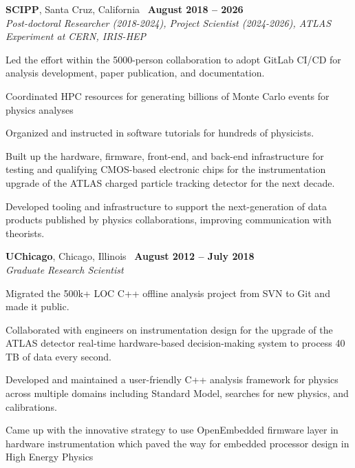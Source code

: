 \documentclass[margin,line]{resume}
\begin{document}
\begin{resume}
\textbf{SCIPP}, Santa Cruz, California \hfill \faCalendar\ \textbf{August 2018 -- 2026}\\
\textsl{Post-doctoral Researcher (2018-2024), Project Scientist (2024-2026), ATLAS Experiment at CERN, IRIS-HEP}
\begin{list2}
  \small
  \item Led the effort within the 5000-person collaboration to adopt GitLab CI/CD for analysis development, paper publication, and documentation.
  \item Coordinated HPC resources for generating billions of Monte Carlo events for physics analyses
  \item Organized and instructed in software tutorials for hundreds of physicists.
  \item Built up the hardware, firmware, front-end, and back-end infrastructure for testing and qualifying CMOS-based electronic chips for the instrumentation upgrade of the ATLAS charged particle tracking detector for the next decade.
  \item Developed tooling and infrastructure to support the next-generation of data products published by physics collaborations, improving communication with theorists.
\end{list2}

\textbf{UChicago}, Chicago, Illinois \hfill \faCalendar\ \textbf{August 2012 -- July 2018}\\
\textsl{Graduate Research Scientist}
\begin{list2}
  \small
  \item Migrated the 500k+ LOC C++ offline analysis project from SVN to Git and made it public.
  \item Collaborated with engineers on instrumentation design for the upgrade of the ATLAS detector real-time hardware-based decision-making system to process 40 TB of data every second.
  \item Developed and maintained a user-friendly C++ analysis framework for physics across multiple domains including Standard Model, searches for new physics, and calibrations.
  \item Came up with the innovative strategy to use OpenEmbedded firmware layer in hardware instrumentation which paved the way for embedded processor design in High Energy Physics
\end{list2}


\end{resume}
\end{document}
